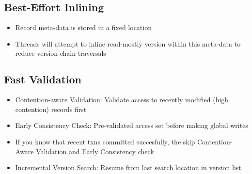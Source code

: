 \documentclass[11pt]{article}
\begin{document}
    \subsection*{Best-Effort Inlining}
    \begin{itemize}
        \item Record meta-data is stored in a fixed location
        \item Threads will attempt to inline read-mostly version within this meta-data to reduce version chain traversals
    \end{itemize}
    \subsection*{Fast Validation}
    \begin{itemize}
        \item Contention-aware Validation: Validate access to recently modified (high contention) records first
        \item Early Consistency Check: Pre-validated access set before making global writes
        \item If you know that recent txns committed succesfully, the skip Contention-Aware Validation and Early Consistency check
        \item Incremental Version Search: Resume from last search location in version list
\end{itemize}


\newpage


\end{document}
